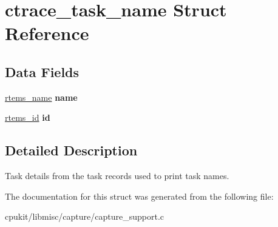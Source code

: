 \hypertarget{structctrace__task__name}{}\section{ctrace\+\_\+task\+\_\+name Struct Reference}
\label{structctrace__task__name}
\subsection*{Data Fields}
\begin{DoxyCompactItemize}
\item 
\mbox{\label{structctrace__task__name_a89780f92fb37e56e60f9b2360413ce98}} 
\mbox{\hyperlink{group__ClassicTasks_ga55fb63c49f68c0cbd9bee004da15b1fd}{rtems\+\_\+name}} {\bfseries name}
\item 
\mbox{\label{structctrace__task__name_aa0ebee4cc548381ba9daf2f486e76c0f}} 
\mbox{\hyperlink{group__ClassicTasks_gab20892b814dced7dd4e5b9bf42becd57}{rtems\+\_\+id}} {\bfseries id}
\end{DoxyCompactItemize}


\subsection{Detailed Description}
Task details from the task records used to print task names. 

The documentation for this struct was generated from the following file\+:\begin{DoxyCompactItemize}
\item 
cpukit/libmisc/capture/capture\+\_\+support.\+c\end{DoxyCompactItemize}
